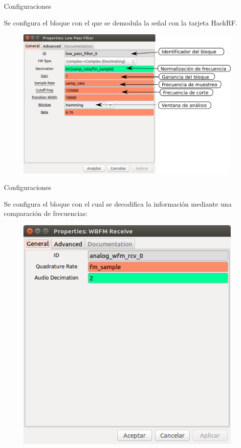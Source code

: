 \begin{frame}{Configuraciones}

Se configura el bloque con el que se demodula la señal con la tarjeta HackRF.

\begin{figure}[H]
\centering
\vspace{-3mm}
\includegraphics[width=.8\textwidth]{parte3/lab10/pdf/lab10_10.pdf}
\end{figure}

\end{frame}

\begin{frame}{Configuraciones}

Se configura el bloque con el cual se decodifica la información mediante una comparación de frecuencias:

\begin{figure}[H]
\centering
\vspace{-3mm}
\includegraphics[width=.5\textwidth]{parte3/lab10/pdf/lab10_11.pdf}
\end{figure}

\end{frame}

